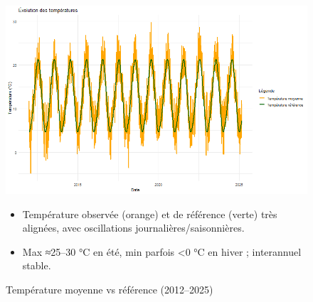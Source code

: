 \documentclass[12pt,a4paper]{article}
\begin{document}
\begin{figure}[H]
  \centering
  \begin{minipage}[t]{0.48\textwidth}
    \centering
    \includegraphics[width=\linewidth]{Projet_partie_A/graphique_temps.png}
    \caption{Température moyenne vs référence (2012–2025)}
    \label{fig:temps_vs_ref}
  \end{minipage}
  \hfill
  \begin{minipage}[t]{0.48\textwidth}
    \small
    \begin{itemize}
      \item Température observée (orange) et de référence (verte) très alignées, avec oscillations journalières/saisonnières.  
      \item Max ≈25–30 °C en été, min parfois <0 °C en hiver ; interannuel stable.  
    \end{itemize}
  \end{minipage}
\end{figure}
\end{document}
